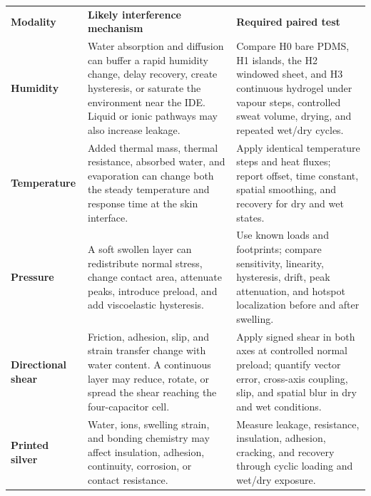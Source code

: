 \hypertarget{q2-hydrogel-interactions}{}

\begingroup
\fontsize{8.8}{10.35}\selectfont
\renewcommand{\arraystretch}{1.13}
\begin{tabularx}{\linewidth}{>{\raggedright\arraybackslash\bfseries\color{AUBRed}}p{2.1cm}Y Y}
\color{white}\textbf{Modality} &
\color{white}\textbf{Likely interference mechanism} &
\color{white}\textbf{Required paired test} \\
Humidity & Water absorption and diffusion can buffer a rapid humidity change,
delay recovery, create hysteresis, or saturate the environment near the IDE.
Liquid or ionic pathways may also increase leakage. & Compare H0 bare PDMS, H1
islands, the H2 windowed sheet, and H3 continuous hydrogel under vapour steps,
controlled sweat volume, drying, and repeated wet/dry cycles. \\
Temperature & Added thermal mass, thermal resistance, absorbed water, and
evaporation can change both the steady temperature and response time at the
skin interface. & Apply identical temperature steps and heat fluxes; report
offset, time constant, spatial smoothing, and recovery for dry and wet states. \\
Pressure & A soft swollen layer can redistribute normal stress, change contact
area, attenuate peaks, introduce preload, and add viscoelastic hysteresis. & Use
known loads and footprints; compare sensitivity, linearity, hysteresis, drift,
peak attenuation, and hotspot localization before and after swelling. \\
Directional shear & Friction, adhesion, slip, and strain transfer change with
water content. A continuous layer may reduce, rotate, or spread the shear
reaching the four-capacitor cell. & Apply signed shear in both axes at controlled
normal preload; quantify vector error, cross-axis coupling, slip, and spatial
blur in dry and wet conditions. \\
Printed silver & Water, ions, swelling strain, and bonding chemistry may affect
insulation, adhesion, continuity, corrosion, or contact resistance. & Measure
leakage, resistance, insulation, adhesion, cracking, and recovery through cyclic
loading and wet/dry exposure. \\
\end{tabularx}
\endgroup
{}

